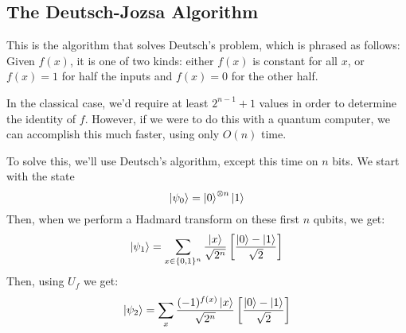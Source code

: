 \subsection{The Deutsch-Jozsa Algorithm}
This is the algorithm that solves Deutsch's problem, which is phrased as follows: Given \( f(x) \), it is one 
of two kinds: either \( f(x) \) is constant for all \( x \), or \( f(x) =1 \)  for half the inputs and \( f(x) = 0 \) 
for the other half. 

In the classical case, we'd require at least \( 2^{n-1} + 1 \) values in order to determine the identity of \( f \). However, 
if we were to do this with a quantum computer, we can accomplish this much faster, using only \( O(n) \) time. 

To solve this, we'll use Deutsch's algorithm, except this time on \( n \) bits. We start with the state  
\[
\ket{\psi_0} = \ket{0}^{\otimes n}\ket{1}
\] 
Then, when we perform a Hadmard transform on these first \( n \) qubits, we get:
\[
	\ket{\psi_1} = \sum_{x \in \{0, 1\} ^{n}} \frac{\ket{x}}{\sqrt{2^{n}} }\left[ \frac{\ket{0} - \ket{1}}{\sqrt{2} } \right] 
\] 
Then, using \( U_f \) we get:
\[
\ket{\psi_2} = \sum_x \frac{(-1)^{f(x)} \ket{x}}{\sqrt{2^{n}} }\left[ \frac{\ket{0} - \ket{1}}{\sqrt{2} } \right] 
\] 
